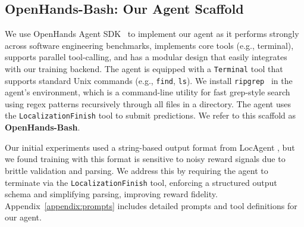\subsection{OpenHands-Bash: Our Agent Scaffold}\label{sec:agent_scaffold}

We use OpenHands Agent SDK~\citep{wang2025openhandssoftwareagentsdk} to implement our agent as it performs strongly across software engineering benchmarks, implements core tools (e.g., terminal), supports parallel tool-calling, and has a modular design that easily integrates with our training backend. The agent is equipped with a \texttt{Terminal} tool that supports standard Unix commands (e.g., \texttt{find}, \texttt{ls}). We install \texttt{ripgrep}~\citep{ripgrep} in the agent's environment, which is a command-line utility for fast grep-style search using regex patterns recursively through all files in a directory. The agent uses the \texttt{LocalizationFinish} tool to submit predictions. We refer to this scaffold as \textbf{OpenHands-Bash}.

Our initial experiments used a string-based output format from LocAgent \citep{chen-etal-2025-locagent}, but we found training with this format is sensitive to noisy reward signals due to brittle validation and parsing. We address this by requiring the agent to terminate via the \texttt{LocalizationFinish} tool, enforcing a structured output schema and simplifying parsing, improving reward fidelity. Appendix~\ref{appendix:prompts} includes detailed prompts and tool definitions for our agent.

